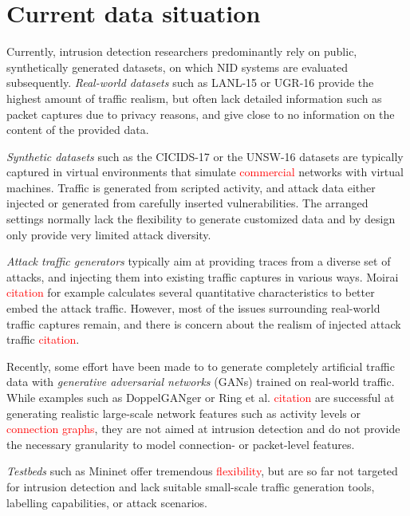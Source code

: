 \documentclass[sigconf]{acmart}
\begin{document}
\section{Current data situation}

Currently, intrusion detection researchers predominantly rely on public, synthetically generated datasets, on which NID systems are evaluated subsequently.
\textit{Real-world datasets} such as LANL-15 \cite{kent-2015-cyberdata1} or UGR-16 \cite{macia2018ugr} provide the highest amount of traffic realism, but often lack detailed information such as packet captures due to privacy reasons, and give close to no information on the content of the provided data. 

\textit{Synthetic datasets} such as the CICIDS-17 \cite{sharafaldin2018towards} or the UNSW-16  \cite{moustafa2015unsw} datasets are typically captured in virtual environments that simulate \textcolor{red}{commercial} networks with virtual machines. Traffic is generated from scripted activity, and attack data either injected or generated from carefully inserted vulnerabilities. The arranged settings normally lack the flexibility to generate customized data and by design only provide very limited attack diversity.

\textit{Attack traffic generators} typically aim at providing traces from a diverse set of attacks, and injecting them into existing traffic captures in various ways. Moirai \textcolor{red}{citation} for example calculates several quantitative characteristics to better embed the attack traffic.  However, most of the issues surrounding real-world traffic captures remain, and there is concern about the realism of injected attack traffic \textcolor{red}{citation}.

Recently, some effort have been made to to generate completely artificial traffic data with \textit{generative adversarial networks} (GANs) trained on real-world traffic. While examples such as DoppelGANger or Ring et al. \textcolor{red}{citation} are successful at generating realistic large-scale network features such as activity levels or \textcolor{red}{connection graphs}, they are not aimed at intrusion detection and do not provide the necessary granularity to model connection- or packet-level features.

 \textit{Testbeds} such as Mininet offer tremendous \textcolor{red}{flexibility}, but are so far not targeted for intrusion detection and lack suitable small-scale traffic generation tools, labelling capabilities, or attack scenarios. 
\end{document}
